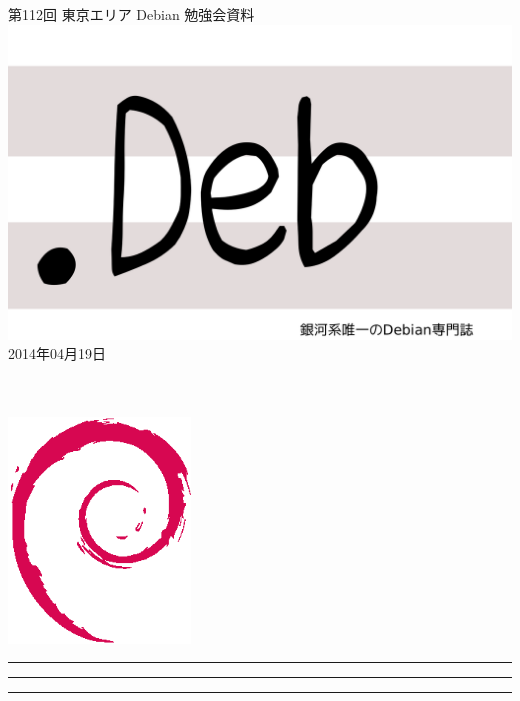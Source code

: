 \documentclass[mingoth,a4paper]{jsarticle}
\newcommand{\debmtgyear}{2014}
\newcommand{\debmtgmonth}{04}
\newcommand{\debmtgdate}{19}
\newcommand{\debmtgnumber}{112}
\begin{document}
\begin{titlepage}
\thispagestyle{empty}

\vspace*{-2cm}
第\debmtgnumber{}回 東京エリア Debian 勉強会資料\\
\hspace*{-2cm}
\includegraphics{image2012-natsu/dotdeb.pdf}\\
\hfill{}\debmtgyear{}年\debmtgmonth{}月\debmtgdate{}日

\\
\\

\vspace*{-2cm}
\hfill{}\includegraphics[height=6cm]{image200502/openlogo-nd.eps}
\end{titlepage}

\newpage

\begin{minipage}[b]{0.2\hsize}
 \colorbox{titleback}{}
\end{minipage}
\begin{minipage}[b]{0.8\hsize}
\hrule
\vspace{2mm}
\hrule
\begin{multicols}{2}
\tableofcontents
\end{multicols}
\vspace{2mm}
\hrule
\end{minipage}
\end{document}
